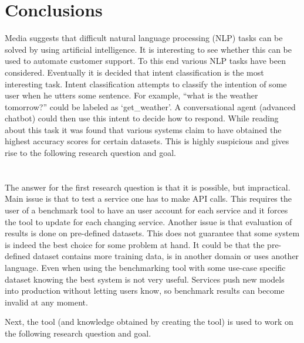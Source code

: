 \chapter{Conclusions}
\label{ch:conclusions}
Media suggests that difficult natural language processing (NLP) tasks can be solved by using artificial intelligence.
It is interesting to see whether this can be used to automate customer support.
To this end various NLP tasks have been considered.
Eventually it is decided that intent classification is the most interesting task.
Intent classification attempts to classify the intention of some user when he utters some sentence.
For example, ``what is the weather tomorrow?'' could be labeled as `get\_weather'.
A conversational agent (advanced chatbot) could then use this intent to decide how to respond.
While reading about this task it was found that various systems claim to have obtained the highest accuracy scores for certain datasets.
This is highly suspicious and gives rise to the following research question and goal.\\

\rqone\\

\rgone\\

The answer for the first research question is that it is possible, but impractical.
Main issue is that to test a service one has to make API calls.
This requires the user of a benchmark tool to have an user account for each service and it forces the tool to update for each changing service.
Another issue is that evaluation of results is done on pre-defined datasets.
This does not guarantee that some system is indeed the best choice for some problem at hand.
It could be that the pre-defined dataset contains more training data, is in another domain or uses another language.
Even when using the benchmarking tool with some use-case specific dataset knowing the best system is not very useful.
Services push new models into production without letting users know, so benchmark results can become invalid at any moment.

Next, the tool (and knowledge obtained by creating the tool) is used to work on the following research question and goal.\\

\rqtwo\\

\rgtwo\\

